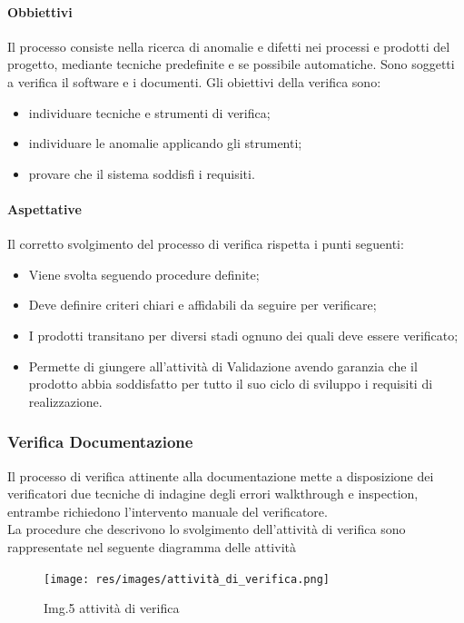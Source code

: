 			\paragraph{Obbiettivi}
				Il processo consiste nella ricerca di anomalie e difetti nei processi e prodotti del progetto, mediante tecniche predefinite e se possibile automatiche. Sono soggetti a verifica il software e i documenti. Gli obiettivi della verifica sono:
				\begin{itemize}
					\item  individuare tecniche e strumenti di verifica;
					\item  individuare le anomalie applicando gli strumenti;
					\item  provare che il sistema soddisfi i requisiti.
				\end{itemize}
			\paragraph{Aspettative}
				Il corretto svolgimento del processo di verifica rispetta i punti seguenti:\\
				\begin{itemize}
					\item  Viene svolta seguendo procedure definite;
					\item  Deve definire criteri chiari e affidabili da seguire per verificare;
					\item  I prodotti transitano per diversi stadi ognuno dei quali deve essere verificato;
					\item  Permette di giungere all’attività di Validazione avendo garanzia che il prodotto abbia soddisfatto per tutto il suo ciclo di sviluppo i requisiti di realizzazione.
				\end{itemize}
				
		\subsubsection{Verifica Documentazione}
			Il processo di verifica attinente alla documentazione mette a disposizione dei verificatori due tecniche di indagine degli errori walkthrough e inspection, entrambe richiedono l’intervento manuale del verificatore. \\
			La procedure che descrivono lo svolgimento dell’attività di verifica sono rappresentate nel seguente diagramma delle attività \\
			\begin{figure}[H]
    				\centering
    				\texttt{[image: res/images/attività\_di\_verifica.png]}
				\caption{Img.5 attività di verifica}
				\label{fig:Img.5 attività di verifica}
			\end{figure}
